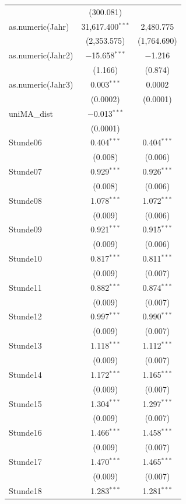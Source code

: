 \documentclass[a4paper,12pt]{thesis}
\begin{document}
\begin{longtable}{@{\extracolsep{-5pt}}lcc}
		& (300.081) &  \\ 
		as.numeric(Jahr) & 31,617.400$^{***}$ & 2,480.775 \\ 
		& (2,353.575) & (1,764.690) \\ 
		as.numeric(Jahr2) & $-$15.658$^{***}$ & $-$1.216 \\ 
		& (1.166) & (0.874) \\ 
		as.numeric(Jahr3) & 0.003$^{***}$ & 0.0002 \\ 
		& (0.0002) & (0.0001) \\ 
		uniMA\_dist & $-$0.013$^{***}$ &  \\ 
		& (0.0001) &  \\ 
		Stunde06 & 0.404$^{***}$ & 0.404$^{***}$ \\ 
		& (0.008) & (0.006) \\ 
		Stunde07 & 0.929$^{***}$ & 0.926$^{***}$ \\ 
		& (0.008) & (0.006) \\ 
		Stunde08 & 1.078$^{***}$ & 1.072$^{***}$ \\ 
		& (0.009) & (0.006) \\ 
		Stunde09 & 0.921$^{***}$ & 0.915$^{***}$ \\ 
		& (0.009) & (0.006) \\ 
		Stunde10 & 0.817$^{***}$ & 0.811$^{***}$ \\ 
		& (0.009) & (0.007) \\ 
		Stunde11 & 0.882$^{***}$ & 0.874$^{***}$ \\ 
		& (0.009) & (0.007) \\ 
		Stunde12 & 0.997$^{***}$ & 0.990$^{***}$ \\ 
		& (0.009) & (0.007) \\ 
		Stunde13 & 1.118$^{***}$ & 1.112$^{***}$ \\ 
		& (0.009) & (0.007) \\ 
		Stunde14 & 1.172$^{***}$ & 1.165$^{***}$ \\ 
		& (0.009) & (0.007) \\ 
		Stunde15 & 1.304$^{***}$ & 1.297$^{***}$ \\ 
		& (0.009) & (0.007) \\ 
		Stunde16 & 1.466$^{***}$ & 1.458$^{***}$ \\ 
		& (0.009) & (0.007) \\ 
		Stunde17 & 1.470$^{***}$ & 1.465$^{***}$ \\ 
		& (0.009) & (0.007) \\ 
		Stunde18 & 1.283$^{***}$ & 1.281$^{***}$ \\ 

\end{longtable}
\end{document}
